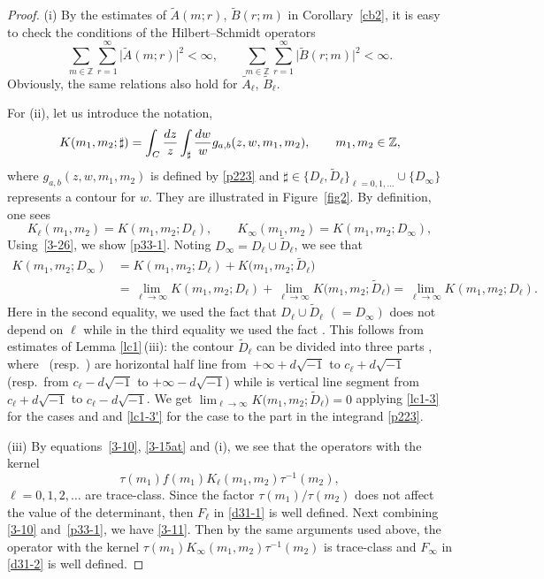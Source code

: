 \documentclass[11pt]{article}
\numberwithin{equation}{section}
\numberwithin{equation}{section}
\def\i{\infty}
\def\t{\tau}
\def\Z{\mathbb{Z}}
\begin{document}
\begin{proof}
 (i) By the estimates of $\tilde{A}(m;r)$, $\tilde{B}(r;m)$ in Corollary~\ref{cb2},
 it is easy to check
 the conditions of the Hilbert--Schmidt operators
\[
 \sum_{m\in\Z}\sum_{r=1}^{\i}\big|\tilde{A}(m;r)\big|^2<\i,
 \qquad
 \sum_{m\in\Z}\sum_{r=1}^{\i}\big|\tilde{B}(r;m)\big|^2<\i.
\]
Obviously, the same relations also hold for $\tilde{A}_{\ell}$, $\tilde{B}_{\ell}$.

 For (ii), let us introduce the notation,
\begin{align}
\label{3-26}
 K(m_1,m_2;\sharp)=
 \int_C\frac{{\rm d}z}{z}
 \int_{\sharp}\frac{{\rm d}w}{w}
 g_{a,b}(z,w,m_1,m_2), \qquad m_1,m_2\in\Z,
\end{align}
 where $g_{a,b}(z,w,m_1,m_2)$ is defined by \eqref{p223} and $\sharp\in\big\{D_{\ell}, \tilde{D}_{\ell}\big\}_{\ell=0,1,\dots}\cup\{D_{\i}\}$ represents a contour for $w$. They are illustrated in Figure~\ref{fig2}. By definition, one sees
\[%
 K_\ell(m_1,m_2)=K(m_1,m_2;D_\ell),\qquad
 K_{\i}(m_1,m_2)= K(m_1,m_2;D_\i),
\]
Using~\eqref{3-26}, we show \eqref{p33-1}.
 Noting $D_{\i}=D_\ell\cup\tilde{D}_\ell$, we see that
\begin{align*}%
 K(m_1,m_2;D_{\i})
 &=
 K(m_1,m_2;D_\ell)+ K\big(m_1,m_2;\tilde{D}_\ell\big)
 \\
 &=
 \lim_{\ell\rightarrow\i}K(m_1,m_2;D_\ell)
 +
 \lim_{\ell\rightarrow\i}K\big(m_1,m_2;\tilde{D}_\ell\big)
 =\lim_{\ell\rightarrow\i}K(m_1,m_2;D_\ell).
\end{align*}
 Here in the second equality, we used the
 fact that $D_\ell\cup\tilde{D}_\ell$ $(=D_{\i})$
 does not depend on $\ell$ while in the third equality we used the
 fact \smash{$\lim_{\ell\rightarrow\i}K\big(m_1,m_2;\tilde{D}_\ell\big)=0$}. This follows from estimates of Lemma \ref{lc1}\,(iii): the contour $\tilde{D}_\ell$ can be divided into three
 parts , where~ \big(resp.\ \big) are horizontal half line from~${+\infty+ d\sqrt{-1}}$ to $c_{\ell}+d\sqrt{-1}$ (resp.\ from $c_{\ell}-d\sqrt{-1}$ to $+\infty-d\sqrt{-1}$) while  is vertical line segment from $c_{\ell}+d\sqrt{-1}$ to $c_{\ell}-d\sqrt{-1}$. We get $\lim_{\ell\rightarrow\i}K\big(m_1,m_2;\tilde{D}_\ell\big)=0$ applying \eqref{lc1-3} for the cases  and  and \eqref{lc1-3'} for the case  to the part  in the integrand \eqref{p223}.

(iii)
 By equations~\eqref{3-10}, \eqref{3-15at} and (i), we see that the operators with the kernel
 \[\t(m_1)f(m_1) K_\ell(m_1,m_2)\t^{-1}(m_2),\]
 $\ell=0,1,2,\dots$ are trace-class. Since the factor $\t(m_1)/\t(m_2)$ does not affect the value of the determinant, then $F_\ell$ in \eqref{d31-1} is well defined.
 Next combining \eqref{3-10} and~\eqref{p33-1}, we have \eqref{3-11}. Then by the same arguments used above, the operator with the kernel $\t(m_1)K_\i (m_1,m_2)\t^{-1}(m_2)$ is trace-class and $F_\infty$ in \eqref{d31-2} is well defined.
\end{proof}
\end{document}

